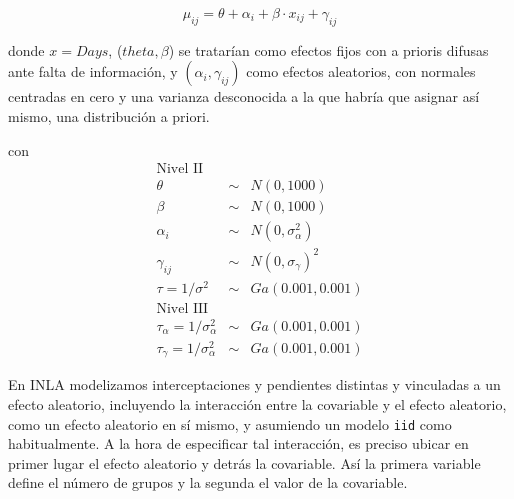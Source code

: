 \documentclass[
]{book}
\begin{document}
\[\mu_{ij}=\theta + \alpha_i + \beta \cdot x_{ij} + \gamma_{ij}\]

donde \(x=Days\), (\(theta,\beta\)) se tratarían como efectos fijos con a prioris difusas ante falta de información, y \((\alpha_i,\gamma_{ij})\) como efectos aleatorios, con normales centradas en cero y una varianza desconocida a la que habría que asignar así mismo, una distribución a priori.

con
\begin{eqnarray*}
\text{Nivel II} && \\
\theta &\sim & N(0,1000) \\
\beta &\sim& N(0,1000) \\
\alpha_i &\sim& N(0,\sigma_{\alpha}^2) \\
\gamma_{ij} &\sim & N(0,\sigma_{\gamma})^2 \\
\tau=1/\sigma^2 &\sim& Ga(0.001,0.001)\\
\text{Nivel III} && \\
\tau_{\alpha}=1/\sigma_{\alpha}^2 &\sim& Ga(0.001,0.001) \\
\tau_{\gamma}=1/\sigma_{\alpha}^2 &\sim& Ga(0.001,0.001) \end{eqnarray*}

En INLA modelizamos interceptaciones y pendientes distintas y vinculadas a un efecto aleatorio, incluyendo la interacción entre la covariable y el efecto aleatorio, como un efecto aleatorio en sí mismo, y asumiendo un modelo \texttt{iid} como habitualmente. A la hora de especificar tal interacción, es preciso ubicar en primer lugar el efecto aleatorio y detrás la covariable. Así la primera variable define el número de grupos y la segunda el valor de la covariable.
\end{document}
